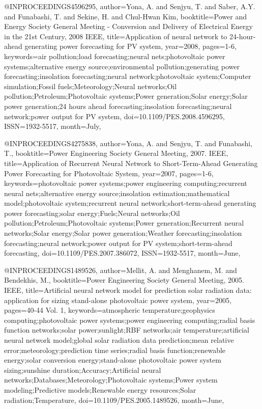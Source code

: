 @INPROCEEDINGS{4596295, 
author={Yona, A. and Senjyu, T. and Saber, A.Y. and Funabashi, T. and Sekine, H. and Chul-Hwan Kim}, 
booktitle={Power and Energy Society General Meeting - Conversion and Delivery of Electrical Energy in the 21st Century, 2008 IEEE}, 
title={Application of neural network to 24-hour-ahead generating power forecasting for PV system}, 
year={2008}, 
pages={1-6}, 
keywords={air pollution;load forecasting;neural nets;photovoltaic power systems;alternative energy source;environmental pollution;generating power forecasting;insolation forecasting;neural network;photovoltaic system;Computer simulation;Fossil fuels;Meteorology;Neural networks;Oil pollution;Petroleum;Photovoltaic systems;Power generation;Solar energy;Solar power generation;24 hours ahead forecasting;insolation forecasting;neural network;power output for PV system}, 
doi={10.1109/PES.2008.4596295}, 
ISSN={1932-5517}, 
month={July},}

@INPROCEEDINGS{4275838, 
author={Yona, A. and Senjyu, T. and Funabashi, T.}, 
booktitle={Power Engineering Society General Meeting, 2007. IEEE}, 
title={Application of Recurrent Neural Network to Short-Term-Ahead Generating Power Forecasting for Photovoltaic System}, 
year={2007}, 
pages={1-6}, 
keywords={photovoltaic power systems;power engineering computing;recurrent neural nets;alternative energy source;insolation estimation;mathematical model;photovoltaic system;recurrent neural network;short-term-ahead generating power forecasting;solar energy;Fuels;Neural networks;Oil pollution;Petroleum;Photovoltaic systems;Power generation;Recurrent neural networks;Solar energy;Solar power generation;Weather forecasting;insolation forecasting;neural network;power output for PV system;short-term-ahead forecasting}, 
doi={10.1109/PES.2007.386072}, 
ISSN={1932-5517}, 
month={June},}

@INPROCEEDINGS{1489526, 
author={Mellit, A. and Menghanem, M. and Bendekhis, M.}, 
booktitle={Power Engineering Society General Meeting, 2005. IEEE}, 
title={Artificial neural network model for prediction solar radiation data: application for sizing stand-alone photovoltaic power system}, 
year={2005}, 
pages={40-44 Vol. 1}, 
keywords={atmospheric temperature;geophysics computing;photovoltaic power systems;power engineering computing;radial basis function networks;solar power;sunlight;RBF networks;air temperature;artificial neural network model;global solar radiation data prediction;mean relative error;meteorology;prediction time series;radial basis function;renewable energy;solar conversion energy;stand-alone photovoltaic power system sizing;sunshine duration;Accuracy;Artificial neural networks;Databases;Meteorology;Photovoltaic systems;Power system modeling;Predictive models;Renewable energy resources;Solar radiation;Temperature}, 
doi={10.1109/PES.2005.1489526}, 
month={June},}

